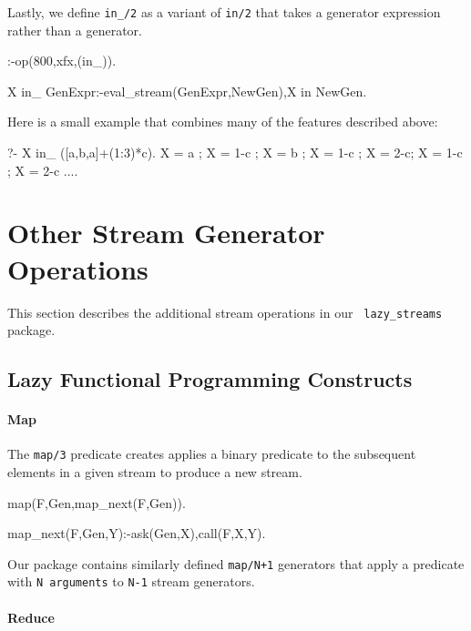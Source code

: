 \documentclass{new_tlp}
\begin{document}
Lastly, we define {\tt in\_/2} as a variant of \texttt{in/2} that takes a 
generator expression rather than a generator.
\begin{code}
:-op(800,xfx,(in_)).

X in_ GenExpr:-eval_stream(GenExpr,NewGen),X in NewGen.     
\end{code}
Here is a small example that combines many of the features described above:
\begin{codex}
?- X in_ ({[a,b,a]}+(1:3)*c).
X = a ; X = 1-c ; X = b ; X = 1-c ; X = 2-c; X = 1-c ; X = 2-c ....
\end{codex}




\section{Other Stream Generator Operations}\label{other}

This section describes the additional stream operations in our {\tt
lazy\_streams} package.

\subsection{Lazy Functional Programming Constructs}\label{sec:other:fp}

\paragraph{Map}

The {\tt map/3} predicate creates applies a binary predicate
to the subsequent elements in a given stream to produce a new stream.
\begin{code}
map(F,Gen,map_next(F,Gen)).

map_next(F,Gen,Y):-ask(Gen,X),call(F,X,Y).
\end{code}

Our package contains similarly defined {\tt map/N+1} generators that
apply a predicate with {\tt N arguments} to
{\tt N-1} stream generators.

\paragraph{Reduce}
\end{document}
